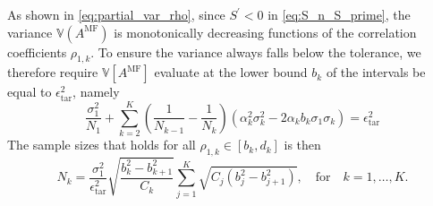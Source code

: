 As shown in \eqref{eq:partial_var_rho}, since $S^\prime<0$ in \eqref{eq:S_n_S_prime}, the variance $\mathbb{V}(A^{\text{MF}})$ is monotonically decreasing functions of the correlation coefficients $\rho_{1,k}$. To ensure the variance always falls below the tolerance, we therefore require $\mathbb{V}\left[A^{\text{MF}}\right]$ evaluate at the lower bound $b_k$ of the intervals be equal to $\epsilon_{\text{tar}}^2$, namely
%
\[
\frac{\sigma_1^2}{N_1} + \sum_{k=2}^K \left(\frac{1}{N_{k-1}} - \frac{1}{N_k}\right)\left(\alpha_k^2\sigma_k^2 - 2\alpha_kb_{k}\sigma_1\sigma_k\right) = \epsilon_{\text{tar}}^2
\]
%
The sample sizes that holds for all $\rho_{1,k}\in [b_k,d_k]$ is then
%
\[
N_k = \frac{\sigma_1^2}{\epsilon_{\text{tar}}^2}\sqrt{\frac{b_k^2-b_{k+1}^2}{C_k}}\sum_{j=1}^K\sqrt{C_j\left(b_j^2-b_{j+1}^2\right)},\quad \text{for}\quad  k=1,\ldots,K.
\]



